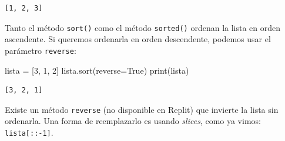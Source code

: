 \documentclass[
  letterpaper,
  DIV=11,
  numbers=noendperiod]{scrreprt}
\newenvironment{Shaded}{\begin{snugshade}}{\end{snugshade}}
\newcommand{\BuiltInTok}[1]{\textcolor[rgb]{0.00,0.23,0.31}{#1}}
\newcommand{\DecValTok}[1]{\textcolor[rgb]{0.68,0.00,0.00}{#1}}
\newcommand{\NormalTok}[1]{\textcolor[rgb]{0.00,0.23,0.31}{#1}}
\newcommand{\OperatorTok}[1]{\textcolor[rgb]{0.37,0.37,0.37}{#1}}
\newcommand{\VariableTok}[1]{\textcolor[rgb]{0.07,0.07,0.07}{#1}}
\begin{document}
\begin{verbatim}
[1, 2, 3]
\end{verbatim}

Tanto el método \texttt{sort()} como el método \texttt{sorted()} ordenan
la lista en orden ascendente. Si queremos ordenarla en orden
descendente, podemos usar el parámetro \texttt{reverse}:

\begin{Shaded}
\begin{Highlighting}[]
\NormalTok{lista }\OperatorTok{=}\NormalTok{ [}\DecValTok{3}\NormalTok{, }\DecValTok{1}\NormalTok{, }\DecValTok{2}\NormalTok{]}
\NormalTok{lista.sort(reverse}\OperatorTok{=}\VariableTok{True}\NormalTok{)}
\BuiltInTok{print}\NormalTok{(lista)}
\end{Highlighting}
\end{Shaded}

\begin{verbatim}
[3, 2, 1]
\end{verbatim}

Existe un método \texttt{reverse} (no disponible en Replit) que invierte
la lista sin ordenarla. Una forma de reemplazarlo es usando
\emph{slices}, como ya vimos: \texttt{lista{[}::-1{]}}.
\end{document}

